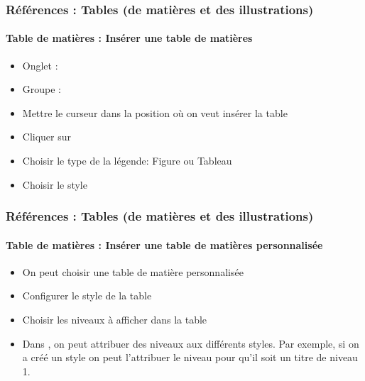 \documentclass[xcolor=table]{beamer}
\begin{document}
\begin{frame}
\frametitle{Références : Tables (de matières et des illustrations)}
\framesubtitle{Table de matières : Insérer une table de matières}

\begin{minipage}{0.59\textwidth}
	\begin{itemize}
		\item Onglet : 
		\item Groupe : 
		\item Mettre le curseur dans la position où on veut insérer la table
		\item Cliquer sur 
		\item Choisir le type de la légende: Figure ou Tableau
		\item Choisir le style
	\end{itemize}
\end{minipage}
\begin{minipage}{0.40\textwidth}
\end{minipage}

\end{frame}

\begin{frame}
\frametitle{Références : Tables (de matières et des illustrations)}
\framesubtitle{Table de matières : Insérer une table de matières personnalisée}

\begin{minipage}{0.59\textwidth}
	\begin{itemize}
		\item On peut choisir une table de matière personnalisée
		\item Configurer le style de la table 
		\item Choisir les niveaux à afficher dans la table
		\item Dans , on peut attribuer des niveaux aux différents styles. 
		Par exemple, si on a créé un style  on peut l'attribuer le niveau  pour qu'il soit un titre de niveau 1.
	\end{itemize}
\end{minipage}
\begin{minipage}{0.40\textwidth}
	
\end{minipage}

\end{frame}
\end{document}
